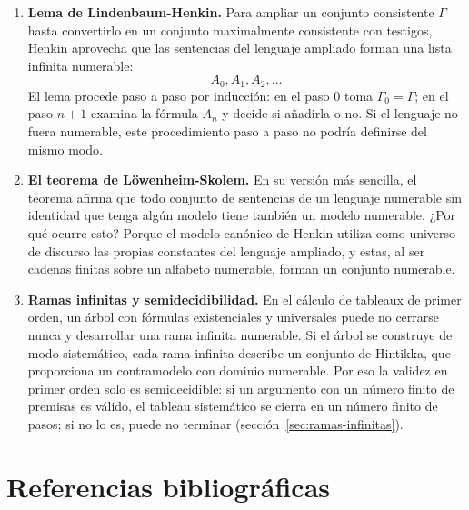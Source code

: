 \begin{enumerate}
    \item \textbf{Lema de Lindenbaum-Henkin.}  
    Para ampliar un conjunto consistente $\Gamma$ hasta convertirlo en un conjunto maximalmente consistente con testigos, Henkin aprovecha que las sentencias del lenguaje ampliado forman una lista infinita numerable:
    \[
    A_0, A_1, A_2, \dots
    \]
    El lema procede paso a paso por inducción: en el paso 0 toma
    $\Gamma_0 = \Gamma$; en el paso $n+1$ examina la fórmula $A_n$ y
    decide si añadirla o no. Si el lenguaje no fuera numerable, este
    procedimiento paso a paso no podría definirse del mismo modo. 

    \item \textbf{El teorema de Löwenheim-Skolem.}  
    En su versión más sencilla, el teorema afirma que todo conjunto de sentencias de un lenguaje numerable sin identidad que tenga algún modelo tiene también un modelo numerable. ¿Por qué ocurre esto? Porque el modelo canónico de Henkin utiliza como universo de discurso las propias constantes del lenguaje ampliado, y estas, al ser cadenas finitas sobre un alfabeto numerable, forman un conjunto numerable.

    \item \textbf{Ramas infinitas y semidecidibilidad.}  
    En el cálculo de tableaux de primer orden, un árbol con fórmulas existenciales y universales puede no cerrarse nunca y desarrollar una rama infinita numerable. Si el árbol se construye de modo sistemático, cada rama infinita describe un conjunto de Hintikka, que proporciona un contramodelo con dominio numerable. Por eso la validez en primer orden solo es semidecidible: si un argumento con un número finito de premisas es válido, el tableau sistemático se cierra en un número finito de pasos; si no lo es, puede no terminar (sección~\ref{sec:ramas-infinitas}).
\end{enumerate}

\section*{Referencias bibliográficas}


